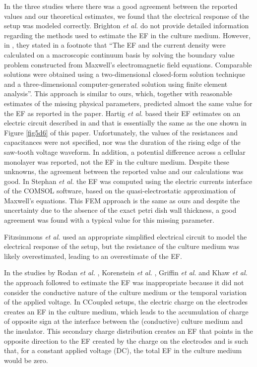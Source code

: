 In the three studies where there was a good agreement between the reported values and our theoretical estimates, we found that the electrical response of the setup was modeled correctly. Brighton \textit{et al.} \cite{Brighton1992-gg} do not provide detailed information regarding the methods used to estimate the \acs{EF} in the culture medium. However, in \cite{Brighton1988-vc}, they stated in a footnote that “The \acs{EF} and the current density were calculated on a macroscopic continuum basis by solving the boundary value problem constructed from Maxwell’s electromagnetic field equations. Comparable solutions were obtained using a two-dimensional closed-form solution technique and a three-dimensional computer-generated solution using finite element analysis”. This approach is similar to ours, which, together with reasonable estimates of the missing physical parameters, predicted almost the same value for the \acs{EF} as reported in the paper. Hartig \textit{et al.} \cite{Hartig2000-ny} based their \acs{EF} estimates on an electric circuit described in \cite{Wiesmann2001-uh} and that is essentially the same as the one shown in Figure \ref{fig5d6} of this paper. Unfortunately, the values of the resistances and capacitances were not specified, nor was the duration of the rising edge of the saw-tooth voltage waveform. In addition, a potential difference across a cellular monolayer was reported, not the \acs{EF} in the culture medium. Despite these unknowns, the agreement between the reported value and our calculations was good. In Stephan \textit{et al.} \cite{Stephan2020-qh} the \acs{EF} was computed using the electric currents interface of the COMSOL software, based on the quasi-electrostatic approximation of Maxwell's equations. This \acs{FEM} approach is the same as ours and despite the uncertainty due to the absence of the exact petri dish wall thickness, a good agreement was found with a typical value for this missing parameter.

Fitzsimmons \textit{et al.} \cite{Fitzsimmons1986-ks} used an appropriate simplified electrical circuit to model the electrical response of the setup, but the resistance of the culture medium was likely overestimated, leading to an overestimate of the \acs{EF}.

In the studies by Rodan \textit{et al.} \cite{Rodan1978-yu}, Korenstein \textit{et al.} \cite{Korenstein1984-qb}, Griffin \textit{et al.} \cite{Griffin2011-bb} and Khaw \textit{et al.} \cite{Khaw2021-tv} the approach followed to estimate the \acs{EF} was inappropriate because it did not consider the conductive nature of the culture medium or the temporal variation of the applied voltage. In \acs{CCoupled} setups, the electric charge on the electrodes creates an \acs{EF} in the culture medium, which leads to the accumulation of charge of opposite sign at the interface between the (conductive) culture medium and the insulator. This secondary charge distribution creates an \acs{EF} that points in the opposite direction to the \acs{EF} created by the charge on the electrodes and is such that, for a constant applied voltage (\acs{DC}), the total \acs{EF} in the culture medium would be zero. 

